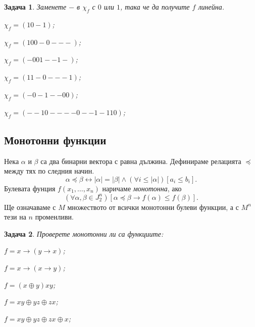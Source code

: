 \documentclass[a4paper]{article}
\newtheorem{problem}{Задача}
\newcommand{\xn}{x_{1},\dots,x_{n}}
\renewcommand{\iff}{\leftrightarrow}
\newcommand{\abs}[1]{\vert{#1}\vert}
\begin{document}
\begin{problem}
  Заменете $-$ в $\chi_f$ с $0$ или $1$, така че да получите $f$ линейна.\\  
  \begin{inparaenum}[a)]
  \item
    $\chi_f = (10-1)$;
  \item
    $\chi_f = (100-0---)$;
  \item
    $\chi_f = (-001--1-)$;
  \item
    $\chi_f = (11-0---1)$;
  \item
    $\chi_f = (-0-1--00)$;
  \item
    $\chi_f = (--10----0--1-110)$;
  \end{inparaenum}
\end{problem}


\subsection{Монотонни функции}

Нека $\alpha$ и $\beta$ са два бинарни вектора с равна дължина.
Дефинираме релацията $\preceq$ между тях по следния начин.
\[\alpha \preceq \beta \iff \abs{\alpha} = \abs{\beta}\wedge (\forall i \leq \abs{\alpha})[a_i \leq b_i].\]
Булевата фунция $f(\xn)$ наричаме {\em монотонна}, ако 
\[(\forall \alpha,\beta\in J^n_2 )[\alpha\preceq\beta \rightarrow f(\alpha) \leq f(\beta)].\]
Ще означаваме с $M$ множеството от всички монотонни булеви функции, а с $M^n$ тези на $n$ променливи.

\begin{problem}
  Проверете монотонни ли са функциите:\\
  \begin{inparaenum}[a)]
  \item
    $f = x\rightarrow (y\rightarrow x)$;
  \item
    $f = x\rightarrow (x\rightarrow y)$;
  \item
    $f = (x\oplus y)xy$;
  \item
    $f = xy\oplus yz \oplus zx$;
  \item
    $f = xy\oplus yz \oplus zx \oplus x$;
  \end{inparaenum}
\end{problem}
\end{document}
